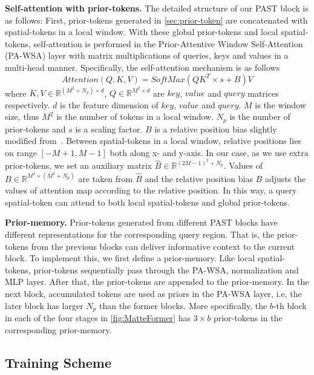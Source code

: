 \documentclass[10pt,twocolumn,letterpaper]{article}
\begin{document}
\textbf{Self-attention with prior-tokens.}
The detailed structure of our PAST block is as follows: First, prior-tokens generated in \cref{sec:prior-token} are concatenated with spatial-tokens in a local window. With these global prior-tokens and local spatial-tokens, self-attention is performed in the Prior-Attentive Window Self-Attention (PA-WSA) layer with matrix multiplications of queries, keys and values in a multi-head manner.
Specifically, the self-attention mechanism is as follows
\begin{equation}
  Attention(Q,K,V) = SoftMax(Q K^{T} \times s + B)V
  \label{eq:self-attention}
\end{equation}
where $ K, V \in \mathbb{R}^{(M^{2}+{N_{p}}) \times d} $, $ Q \in \mathbb{R}^{M^{2} \times d} $ are $key$, $value$ and $query$ matrices respectively.
$d$ is the feature dimension of $key$, $value$ and $query$. 
$M$ is the window size, thus $M^{2}$ is the number of tokens in a local window. ${N_{p}}$ is the number of prior-tokens and $s$ is a scaling factor. 
$B$ is a relative position bias slightly modified from~\cite{liu2021swin}. 
Between spatial-tokens in a local window, relative positions lies on range $\left [-M+1, M-1\right ]$ both along x- and y-axis.
In our case, as we use extra prior-tokens, we set an auxiliary matrix $\hat{B} \in \mathbb{R}^{{\left ( 2M-1 \right )^{2} + {N_{p}}}}$. Values of $B \in \mathbb{R}^{M^{2} \times (M^{2}+{N_{p}})}$ are taken from $\hat{B}$ and the relative position bias $B$ adjusts the values of attention map according to the relative position.
In this way, a query spatial-token can attend to both local spatial-tokens and global prior-tokens.

\textbf{Prior-memory.}
Prior-tokens generated from different PAST blocks have different representations for the corresponding query region. That is, the prior-tokens from the previous blocks can deliver informative context to the current block. To implement this, we first define a prior-memory. Like local spatial-tokens, prior-tokens sequentially pass through the PA-WSA, normalization and MLP layer. After that, the prior-tokens are appended to the prior-memory. In the next block, accumulated tokens are used as priors in the PA-WSA layer, i.e, the later block has larger $N_p$ than the former blocks. 
More specifically, the $b$-th block in each of the four stages in \cref{fig:MatteFormer} has $3\times b$ prior-tokens in the corresponding prior-memory.

\subsection{Training Scheme}
\label{sec:Training}
\end{document}
